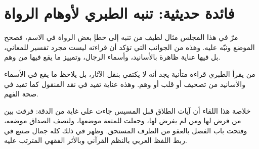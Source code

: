 \section{فائدة حديثية: تنبه الطبري لأوهام الرواة}
مرّ في هذا المجلس مثال لطيف من تنبه  إلى خطإ بعض الرواة في الاسم، فصحح الموضع ونبّه عليه. وهذه من الجوانب التي تؤكد أن قراءته ليست مجرد تفسير للمعاني، بل فيها عناية ظاهرة بالأسانيد، وأسماء الرجال، وتمييز ما يقع فيها من وهم.

\begin{fawaid}
من يقرأ الطبري قراءة متأنية يجد أنه لا يكتفي بنقل الآثار، بل يلاحظ ما يقع في الأسماء والأسانيد من تصحيف أو قلب أو وهم. وهذه عناية تفيد في نقد المنقول كما تفيد في صحة الفهم.
\end{fawaid}

\separator

خلاصة هذا اللقاء أن آيات الطلاق قبل المسيس جاءت على غاية من الدقة: فرقت بين من فرض لها ومن لم يفرض لها، وجعلت للمتعة موضعها، ولنصف الصداق موضعه، وفتحت باب الفضل بالعفو من الطرف المستحق. وظهر في ذلك كله جمال صنيع  في ربط اللفظ العربي بالنظم القرآني وبالأثر الفقهي المترتب عليه.
